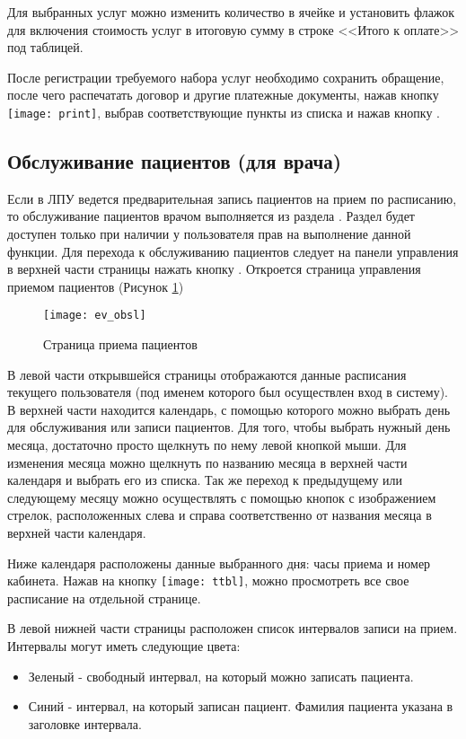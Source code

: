 Для выбранных услуг можно изменить количество в ячейке  и установить флажок  для включения стоимость услуг в итоговую сумму в строке <<Итого к оплате>> под таблицей. 

После регистрации требуемого набора услуг необходимо сохранить обращение, после чего распечатать договор и другие платежные документы, нажав кнопку \texttt{[image: print]}, выбрав соответствующие пункты из списка и нажав кнопку .



\subsection{Обслуживание пациентов (для врача)} \label{pol_ttbl_new}
Если в ЛПУ ведется предварительная запись пациентов на прием по расписанию, то обслуживание пациентов врачом выполняется из раздела . Раздел будет доступен только при наличии у пользователя прав на выполнение данной функции.
Для перехода к обслуживанию пациентов следует на панели управления в верхней части страницы нажать кнопку . Откроется страница управления приемом пациентов (Рисунок \ref{img_ev_obsl}) 

\begin{figure}[ht]\centering
	\texttt{[image: ev\_obsl]}
	\caption{Страница приема пациентов}
	\label{img_ev_obsl}
\end{figure}

В левой части открывшейся страницы отображаются данные расписания текущего пользователя (под именем которого был осуществлен вход в систему).
В верхней части находится календарь, с помощью которого можно выбрать день для обслуживания или записи пациентов. Для того, чтобы выбрать нужный день месяца, достаточно просто щелкнуть по нему левой кнопкой мыши. Для изменения месяца можно щелкнуть по названию месяца в верхней части календаря и выбрать его из списка. Так же переход к предыдущему или следующему месяцу можно осуществлять с помощью кнопок с изображением стрелок, расположенных слева и справа соответственно от названия месяца в верхней части календаря.

Ниже календаря расположены данные выбранного дня: часы приема и номер кабинета. Нажав на кнопку \texttt{[image: ttbl]}, можно просмотреть все свое расписание на отдельной странице.

В левой нижней части страницы расположен список интервалов записи на прием. Интервалы могут иметь следующие цвета:
\begin{itemize}
	\item Зеленый - свободный интервал, на который можно записать пациента.
	\item Синий - интервал, на который записан пациент. Фамилия пациента указана в заголовке интервала.
\end{itemize}

